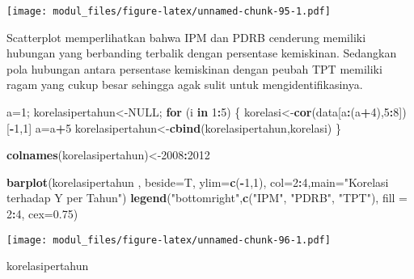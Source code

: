 \documentclass[
]{book}
\newenvironment{Shaded}{\begin{snugshade}}{\end{snugshade}}
\newcommand{\ControlFlowTok}[1]{\textcolor[rgb]{0.13,0.29,0.53}{\textbf{#1}}}
\newcommand{\DataTypeTok}[1]{\textcolor[rgb]{0.13,0.29,0.53}{#1}}
\newcommand{\DecValTok}[1]{\textcolor[rgb]{0.00,0.00,0.81}{#1}}
\newcommand{\FloatTok}[1]{\textcolor[rgb]{0.00,0.00,0.81}{#1}}
\newcommand{\KeywordTok}[1]{\textcolor[rgb]{0.13,0.29,0.53}{\textbf{#1}}}
\newcommand{\NormalTok}[1]{#1}
\newcommand{\OperatorTok}[1]{\textcolor[rgb]{0.81,0.36,0.00}{\textbf{#1}}}
\newcommand{\OtherTok}[1]{\textcolor[rgb]{0.56,0.35,0.01}{#1}}
\newcommand{\StringTok}[1]{\textcolor[rgb]{0.31,0.60,0.02}{#1}}
\begin{document}
\texttt{[image: modul\_files/figure-latex/unnamed-chunk-95-1.pdf]}

Scatterplot memperlihatkan bahwa IPM dan PDRB cenderung memiliki hubungan yang berbanding terbalik dengan persentase kemiskinan. Sedangkan pola hubungan antara persentase kemiskinan dengan peubah TPT memiliki ragam yang cukup besar sehingga agak sulit untuk mengidentifikasinya.

\begin{Shaded}
\begin{Highlighting}[]
\NormalTok{a=}\DecValTok{1}\NormalTok{; korelasipertahun\textless{}{-}}\OtherTok{NULL}\NormalTok{;}
\ControlFlowTok{for}\NormalTok{ (i }\ControlFlowTok{in} \DecValTok{1}\OperatorTok{:}\DecValTok{5}\NormalTok{)}
\NormalTok{\{}
\NormalTok{  korelasi\textless{}{-}}\KeywordTok{cor}\NormalTok{(data[a}\OperatorTok{:}\NormalTok{(a}\OperatorTok{+}\DecValTok{4}\NormalTok{),}\DecValTok{5}\OperatorTok{:}\DecValTok{8}\NormalTok{])[}\OperatorTok{{-}}\DecValTok{1}\NormalTok{,}\DecValTok{1}\NormalTok{]}
\NormalTok{  a=a}\OperatorTok{+}\DecValTok{5}
\NormalTok{  korelasipertahun\textless{}{-}}\KeywordTok{cbind}\NormalTok{(korelasipertahun,korelasi)}
\NormalTok{\}}

\KeywordTok{colnames}\NormalTok{(korelasipertahun)\textless{}{-}}\DecValTok{2008}\OperatorTok{:}\DecValTok{2012}

\KeywordTok{barplot}\NormalTok{(korelasipertahun , }\DataTypeTok{beside=}\NormalTok{T, }\DataTypeTok{ylim=}\KeywordTok{c}\NormalTok{(}\OperatorTok{{-}}\DecValTok{1}\NormalTok{,}\DecValTok{1}\NormalTok{), }\DataTypeTok{col=}\DecValTok{2}\OperatorTok{:}\DecValTok{4}\NormalTok{,}\DataTypeTok{main=}\StringTok{"Korelasi terhadap Y per Tahun"}\NormalTok{)}
\KeywordTok{legend}\NormalTok{(}\StringTok{"bottomright"}\NormalTok{,}\KeywordTok{c}\NormalTok{(}\StringTok{"IPM"}\NormalTok{, }\StringTok{"PDRB"}\NormalTok{, }\StringTok{"TPT"}\NormalTok{),}
\DataTypeTok{fill =} \DecValTok{2}\OperatorTok{:}\DecValTok{4}\NormalTok{, }\DataTypeTok{cex=}\FloatTok{0.75}\NormalTok{)}
\end{Highlighting}
\end{Shaded}

\texttt{[image: modul\_files/figure-latex/unnamed-chunk-96-1.pdf]}

\begin{Shaded}
\begin{Highlighting}[]
\NormalTok{korelasipertahun}
\end{Highlighting}
\end{Shaded}
\end{document}
